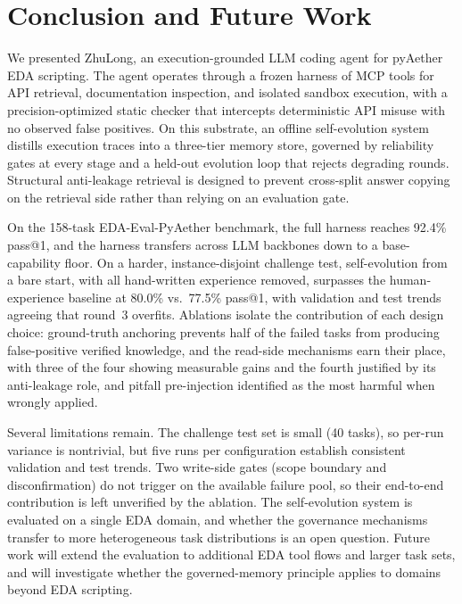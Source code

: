 \documentclass[conference]{IEEEtran}
\begin{document}
\section{Conclusion and Future Work}

We presented ZhuLong, an execution-grounded LLM coding agent for pyAether
EDA scripting. The agent operates through a frozen harness of MCP tools for
API retrieval, documentation inspection, and isolated sandbox execution, with
a precision-optimized static checker that intercepts deterministic API misuse
with no observed false positives. On this substrate, an offline self-evolution system
distills execution traces into a three-tier memory store, governed by
reliability gates at every stage and a held-out evolution loop that rejects
degrading rounds. Structural anti-leakage retrieval is designed to prevent cross-split
answer copying on the retrieval side rather than relying on an evaluation
gate.

On the 158-task EDA-Eval-PyAether benchmark, the full harness reaches 92.4\%
pass@1, and the harness transfers across LLM backbones down to a
base-capability floor. On a harder, instance-disjoint challenge test,
self-evolution from a bare start, with all hand-written experience removed,
surpasses the human-experience baseline at 80.0\% vs.\ 77.5\% pass@1, with
validation and test trends agreeing that round~3 overfits. Ablations isolate the contribution
of each design choice: ground-truth anchoring prevents half of the failed
tasks from producing false-positive verified knowledge, and the read-side
mechanisms earn their place, with three of the four showing measurable gains and the fourth justified by its anti-leakage role, and pitfall pre-injection identified as the
most harmful when wrongly applied.

Several limitations remain. The challenge test set is small (40 tasks), so
per-run variance is nontrivial, but five runs per configuration establish
consistent validation and test trends. Two write-side gates
(scope boundary and disconfirmation) do not trigger on the available failure
pool, so their end-to-end contribution is left unverified by the ablation.
The self-evolution system is evaluated on a single EDA domain, and whether
the governance mechanisms transfer to more heterogeneous task distributions
is an open question. Future work will extend the evaluation to additional
EDA tool flows and larger task sets, and will investigate whether the
governed-memory principle applies to domains beyond EDA scripting.

\clearpage
\balance


\end{document}
